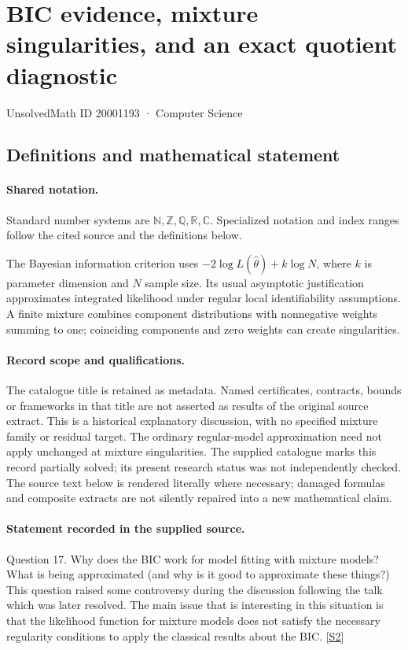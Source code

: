 \documentclass[11pt]{article}
\newcommand{\sref}[2]{\hyperlink{source:#1:#2}{[S#2]}}
\begin{document}
\setcounter{section}{20001192}
\section{BIC evidence, mixture singularities, and an exact quotient diagnostic}\label{20001193}
{\small\sffamily UnsolvedMath ID 20001193 · Computer Science}
\subsection{Definitions and mathematical statement}

\paragraph{Shared notation.}Standard number systems are $\mathbb N,\mathbb Z,\mathbb Q,\mathbb R,\mathbb C$. Specialized notation and index ranges follow the cited source and the definitions below.


The Bayesian information criterion uses $-2\log L(\widehat\theta)+k\log N$, where $k$ is parameter dimension and $N$ sample size. Its usual asymptotic justification approximates integrated likelihood under regular local identifiability assumptions. A finite mixture combines component distributions with nonnegative weights summing to one; coinciding components and zero weights can create singularities.
\paragraph{Record scope and qualifications.}
The catalogue title is retained as metadata. Named certificates, contracts, bounds or frameworks in that title are not asserted as results of the original source extract.
This is a historical explanatory discussion, with no specified mixture family or residual target. The ordinary regular-model approximation need not apply unchanged at mixture singularities. The supplied catalogue marks this record partially solved; its present research status was not independently checked.
The source text below is rendered literally where necessary; damaged formulas and composite extracts are not silently repaired into a new mathematical claim.
\paragraph{Statement recorded in the supplied source.}
Question 17. Why does the BIC work for model fitting with mixture models? What is being approximated (and why is it good to approximate these things?) This question raised some controversy during the discussion following the talk which was later resolved. The main issue that is interesting in this situation is that the likelihood function for mixture models does not satisfy the necessary regularity conditions to apply the classical results about the BIC. \sref{20001193}{2}
\end{document}
